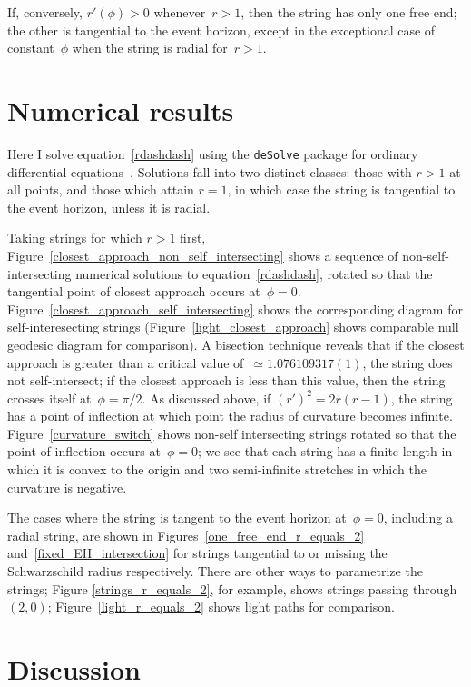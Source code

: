 \documentclass[prb,preprint]{revtex4-1}
\begin{document}
If, conversely, $r'(\phi)>0$ whenever~$r>1$, then the string has only
one free end; the other is tangential to the event horizon, except in
the exceptional case of constant~$\phi$ when the string is radial
for~$r>1$.

\section{Numerical results}

Here I solve equation~\ref{rdashdash} using the \verb+deSolve+ package
for ordinary differential equations~\cite{soetart2010}.  Solutions
fall into two distinct classes: those with $r>1$ at all points, and
those which attain $r=1$, in which case the string is tangential to
the event horizon, unless it is radial.

Taking strings for which $r>1$ first,
Figure~\ref{closest_approach_non_self_intersecting} shows a sequence
of non-self-intersecting numerical solutions to
equation~\ref{rdashdash}, rotated so that the tangential point of
closest approach occurs at~$\phi=0$.
Figure~\ref{closest_approach_self_intersecting} shows the
corresponding diagram for self-interesecting strings
(Figure~\ref{light_closest_approach} shows comparable null geodesic
diagram for comparison).  A bisection technique reveals that if the
closest approach is greater than a critical value of~$\simeq
1.076109317(1)$, the string does not self-intersect; if the closest
approach is less than this value, then the string crosses itself
at~$\phi=\pi/2$.  As discussed above, if $\left(r'\right)^2=2r(r-1)$,
the string has a point of inflection at which point the radius of
curvature becomes infinite.  Figure~\ref{curvature_switch} shows
non-self intersecting strings rotated so that the point of inflection
occurs at~$\phi=0$; we see that each string has a finite length in
which it is convex to the origin and two semi-infinite stretches in
which the curvature is negative.

The cases where the string is tangent to the event horizon
at~$\phi=0$, including a radial string, are shown in
Figures~\ref{one_free_end_r_equals_2} and~\ref{fixed_EH_intersection}
for strings tangential to or missing the Schwarzschild radius
respectively.  There are other ways to parametrize the strings; Figure
\ref{strings_r_equals_2}, for example, shows strings passing
through~$(2,0)$; Figure~\ref{light_r_equals_2} shows light paths for
comparison.

\section{Discussion}
\end{document}
